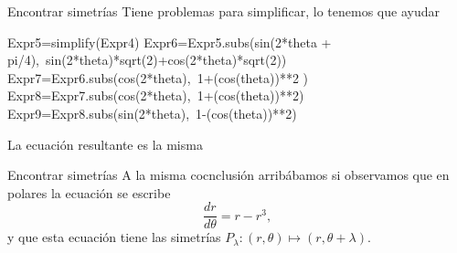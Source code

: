 \documentclass[handout,hyperref={colorlinks=true}]{beamer}
\renewcommand{\emph}[1]{\textcolor[rgb]{1,0,0}{#1}}
\newcommand{\nl}{\onslide<+-> }
\begin{document}
\begin{frame}[fragile]{Encontrar simetrías}
Tiene problemas para simplificar, lo tenemos que ayudar
\begin{sageblock}
Expr5=simplify(Expr4)
Expr6=Expr5.subs(sin(2*theta + pi/4),\
sin(2*theta)*sqrt(2)+cos(2*theta)*sqrt(2))
Expr7=Expr6.subs(cos(2*theta),\
1+(cos(theta))**2   )
Expr8=Expr7.subs(cos(2*theta),\
1+(cos(theta))**2)
Expr9=Expr8.subs(sin(2*theta),\
1-(cos(theta))**2)
\end{sageblock}
La ecuación resultante es \emph{la misma}
\end{frame}




\begin{frame}{Encontrar simetrías}
A la misma cocnclusión arribábamos si observamos que en polares la ecuación se escribe
\[\frac{dr}{d\theta}=r-r^3,\]
y que esta ecuación tiene las simetrías $P_{\lambda}:(r,\theta)\mapsto (r,\theta+\lambda)$. 
\end{frame}












\end{document}
